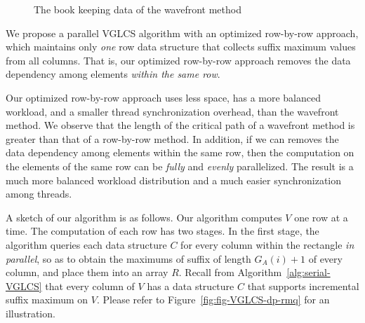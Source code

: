 \begin{figure}[!thb]
  \centering {} 
  \caption{The book keeping data of the wavefront method}
  \label{fig:fig-VGLCS-dp-wavefront}
\end{figure}

We propose a parallel VGLCS algorithm with an optimized row-by-row
approach, which maintains only {\em one} row data structure that
collects suffix maximum values from all columns.  That is, our
optimized row-by-row approach removes the data dependency among
elements {\em within the same row}.

Our optimized row-by-row approach uses less space, has a more balanced
workload, and a smaller thread synchronization overhead, than the
wavefront method.  We observe that the length of the critical path of
a wavefront method is greater than that of a row-by-row method.  In
addition, if we can removes the data dependency among elements within
the same row, then the computation on the elements of the same row can
be {\em fully} and {\em evenly} parallelized.  The result is a much
more balanced workload distribution and a much easier synchronization
among threads.





A sketch of our algorithm is as follows.  Our algorithm computes $V$ one
row at a time.  The computation of each row has two stages.  In the
first stage, the algorithm queries each data structure $C$ for every
column within the rectangle {\em in parallel}, so as to obtain the
maximums of suffix of length $G_A(i) + 1$ of every column, and place
them into an array $R$. Recall from Algorithm~\ref{alg:serial-VGLCS}
that every column of $V$ has a data structure $C$ that supports
incremental suffix maximum on $V$.  Please refer to
Figure~\ref{fig:fig-VGLCS-dp-rmq} for an illustration.

